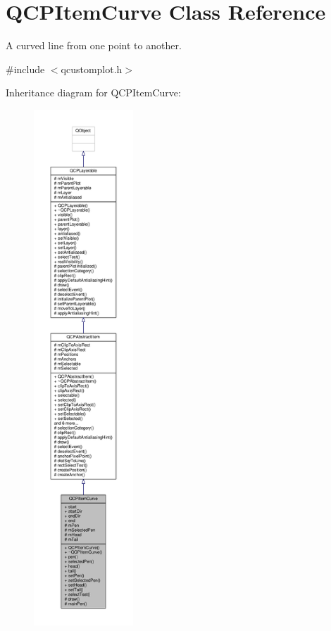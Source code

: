 \hypertarget{class_q_c_p_item_curve}{}\section{Q\+C\+P\+Item\+Curve Class Reference}
\label{class_q_c_p_item_curve}


A curved line from one point to another.  




{\ttfamily \#include $<$qcustomplot.\+h$>$}



Inheritance diagram for Q\+C\+P\+Item\+Curve\+:\nopagebreak
\begin{figure}[H]
\begin{center}
\leavevmode
\includegraphics[height=550pt]{class_q_c_p_item_curve__inherit__graph}
\end{center}
\end{figure}


